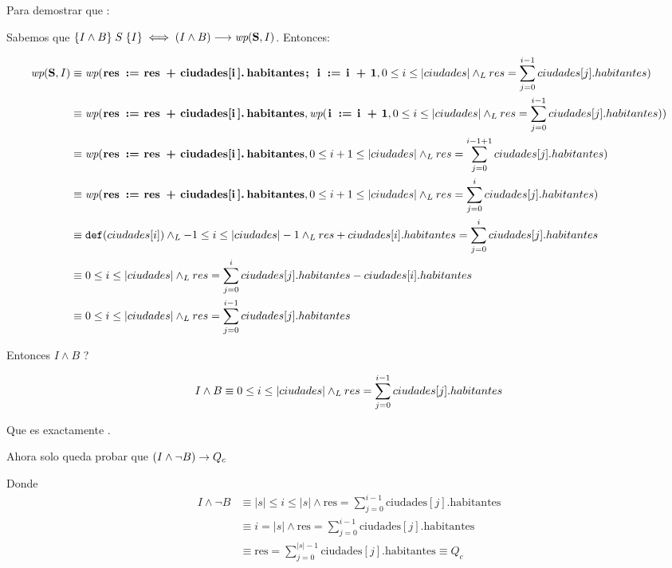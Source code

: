 \documentclass[10pt,a4paper]{article}
\begin{document}
Para demostrar que :

Sabemos que $\hoare{I \land B}{S}{I} \iff (I \land B) \implica \wp{S}{I}$. Entonces:

\begin{align*}
	\wp{S}{I} & \equiv  \wp{ res := res + ciudades[i].habitantes; i := i + 1}{0 \leq i \leq |ciudades| \yLuego res = \sum_{j=0}^{i-1} ciudades[j].habitantes}      \\
	          & \equiv  \wp{ res := res + ciudades[i].habitantes}{\wp{i := i + 1}{0 \leq i \leq |ciudades| \yLuego res = \sum_{j=0}^{i-1} ciudades[j].habitantes}} \\
	          & \equiv  \wp{ res := res + ciudades[i].habitantes}{0 \leq i+1 \leq |ciudades| \yLuego res = \sum_{j=0}^{i-1 + 1} ciudades[j].habitantes}            \\
	          & \equiv  \wp{ res := res + ciudades[i].habitantes}{0 \leq i+1 \leq |ciudades| \yLuego res = \sum_{j=0}^{i} ciudades[j].habitantes}                  \\
	          & \equiv  \Def{ciudades[i]} \yLuego -1 \leq i \leq |ciudades| -1 \yLuego res + ciudades[i].habitantes = \sum_{j=0}^{i} ciudades[j].habitantes        \\
	          & \equiv  0 \leq i \leq |ciudades| \yLuego res = \sum_{j=0}^{i} ciudades[j].habitantes - ciudades[i].habitantes                                      \\
	          & \equiv  0 \leq i \leq |ciudades|  \yLuego res = \sum_{j=0}^{i-1} ciudades[j].habitantes
\end{align*}


Entonces $\ensuremath{I \land B}$  \implica {}?

\[{I \land B}  \equiv  0 \leq i \leq |ciudades|  \land _L res = \sum_{j=0}^{i-1} ciudades[j].habitantes \]

Que es exactamente .
\bigskip

Ahora solo queda probar que  $(I \land \neg B) \rightarrow Q_c$

Donde
\begin{align*}
	I \land \neg B & \equiv |s| \leq i \leq |s| \land \text{res} = \sum_{j=0}^{i-1} \text{ciudades}[j].\text{habitantes} \\
	               & \equiv i = |s| \land \text{res} = \sum_{j=0}^{i-1} \text{ciudades}[j].\text{habitantes}             \\
	               & \equiv \text{res} = \sum_{j=0}^{|s|-1} \text{ciudades}[j].\text{habitantes} \equiv Q_c              \\
\end{align*}
\end{document}
